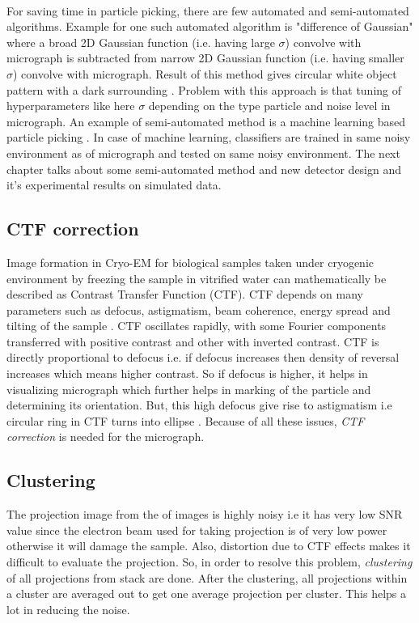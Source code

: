 \documentclass{report}
\begin{document}
\noindent\\
For saving time in particle picking, there are few automated and semi-automated algorithms. Example for one such automated algorithm is "difference of Gaussian" where a broad 2D Gaussian function (i.e. having large $\sigma$) convolve with micrograph is subtracted from narrow 2D Gaussian function (i.e. having smaller $\sigma$) convolve with micrograph. Result of this method gives circular white object pattern  with a dark surrounding \cite{sigworth2016principles}. Problem with this approach is that tuning of hyperparameters like here $\sigma$ depending on the type particle and noise level in micrograph. An example of semi-automated method is a machine learning based particle picking \cite{chen2012detection}. In case of machine learning, classifiers are trained in same noisy environment as of micrograph and tested on same noisy environment. The next chapter talks about some semi-automated method and new detector design and it's experimental results on simulated data.

\subsection{CTF correction}
Image formation in Cryo-EM for biological samples taken under cryogenic environment by freezing the sample in vitrified water can mathematically be described as Contrast Transfer Function (CTF). CTF depends on many parameters such as defocus, astigmatism, beam coherence, energy spread and tilting of the sample \cite{diebolder2012pushing}. CTF oscillates rapidly, with some Fourier components transferred with positive contrast and other with inverted contrast. CTF is directly proportional to defocus i.e. if defocus increases then density of reversal increases which means higher contrast. So if defocus is higher, it helps in visualizing micrograph which further helps in marking of the particle and determining its orientation. But, this high defocus give rise to astigmatism i.e circular ring in CTF turns into  ellipse \cite{sigworth2016principles}. Because of all these issues, \textit{CTF correction} is needed for the micrograph.  

\subsection{Clustering}\label{subsec:clustering}
The projection image from the  of images is highly noisy i.e it has very low SNR value since the electron beam used for taking projection is of very low power otherwise it will damage the sample. Also, distortion due to CTF effects makes it difficult to evaluate the projection. So, in order to resolve this problem, \textit{clustering} of all projections from stack are done. After the clustering, all projections within a cluster are averaged out to get one average projection per cluster. This helps a lot in reducing the noise.   
\end{document}
